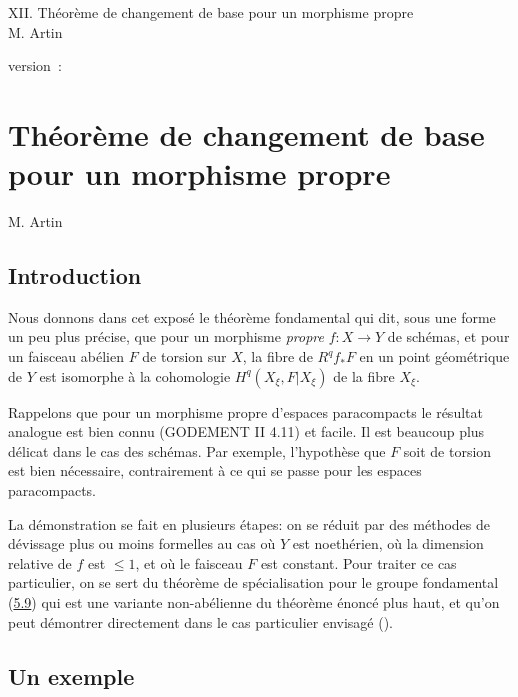 \documentclass[10pt]{../fichiers-configuration-latex/smfart}
\begin{document}
\begin{center}
XII. Théorème de changement de base pour un morphisme propre\\
M. Artin 
\end{center}

version : \showgitstatus{}
\tableofcontents

\else
\chapter{Théorème de changement de base pour un morphisme propre}
\begin{center}
M. Artin 
\end{center}
\fi

\setcounter{pageoriginal}{78}

\section{Introduction}\pageoriginale

Nous donnons dans cet exposé le théorème fondamental qui dit, sous une
forme un peu plus précise, que pour un morphisme \emph{propre}
$f:X\rightarrow Y$ de schémas, et pour un faisceau abélien $F$ de
torsion sur $X$, la fibre de $R^qf_{\ast}F$ en un point géométrique de
$Y$ est isomorphe à la cohomologie $H^q(X_{\xi}, F| X_{\xi})$ de la
fibre $X_{\xi}$.

Rappelons que pour un morphisme propre d'espaces paracompacts le
résultat analogue est bien connu (GODEMENT II 4.11) et facile. Il est
beaucoup plus délicat dans le cas des schémas. Par exemple,
l'hypothèse que $F$ soit de torsion est bien nécessaire, contrairement
à ce qui se passe pour les espaces paracompacts.

La démonstration se fait en plusieurs étapes: on se réduit par des
méthodes de dévissage plus ou moins formelles au cas où $Y$ est
noethérien, où la dimension relative de $f$ est $\leq 1$, et où le
faisceau $F$ est constant. Pour traiter ce cas particulier, on se sert
du théorème de spécialisation pour le groupe fondamental
(\hyperref[XII.thm5.9]{5.9}) qui est 
une variante non-abélienne du théorème énoncé plus haut, et qu'on peut
démontrer directement dans le cas particulier envisagé ().

\section{Un exemple}\pageoriginale
\end{document}
